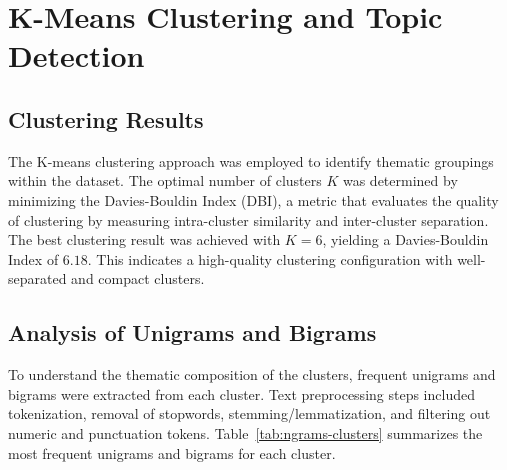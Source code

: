 \section{K-Means Clustering and Topic Detection}

\subsection{Clustering Results}
The K-means clustering approach was employed to identify thematic groupings within the dataset. The optimal number of clusters $K$ was determined by minimizing the Davies-Bouldin Index (DBI), a metric that evaluates the quality of clustering by measuring intra-cluster similarity and inter-cluster separation. The best clustering result was achieved with $K = 6$, yielding a Davies-Bouldin Index of $6.18$. This indicates a high-quality clustering configuration with well-separated and compact clusters.

\subsection{Analysis of Unigrams and Bigrams}
To understand the thematic composition of the clusters, frequent unigrams and bigrams were extracted from each cluster. Text preprocessing steps included tokenization, removal of stopwords, stemming/lemmatization, and filtering out numeric and punctuation tokens. Table~\ref{tab:ngrams-clusters} summarizes the most frequent unigrams and bigrams for each cluster.

